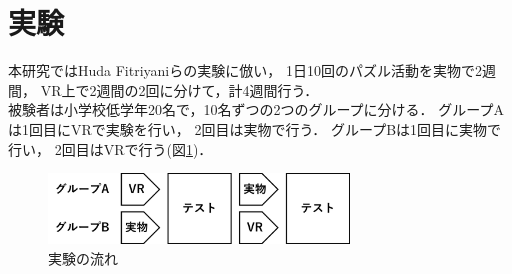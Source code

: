 \newpage
\section{実験}
  本研究ではHuda Fitriyaniらの実験\cite{puzzle}に倣い，
  1日10回のパズル活動を実物で2週間，
  VR上で2週間の2回に分けて，計4週間行う．
  \\\indent
  被験者は小学校低学年20名で，10名ずつの2つのグループに分ける．
  グループAは1回目にVRで実験を行い，
  2回目は実物で行う．
  グループBは1回目に実物で行い，
  2回目はVRで行う(図\ref{flow})．
  \begin{figure}[h]
    \begin{center}
      \includegraphics[width=80mm]{./images/experiment.png}
      \caption{実験の流れ}\label{flow}
    \end{center}
  \end{figure}
